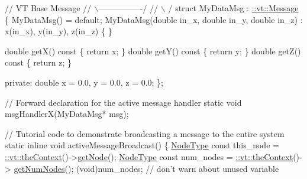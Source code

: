 \begin{DoxyCodeInclude}
\textcolor{comment}{//                  VT Base Message}
\textcolor{comment}{//                 \(\backslash\)----------------/}
\textcolor{comment}{//                  \(\backslash\)              /}
\textcolor{keyword}{struct }MyDataMsg : \hyperlink{structvt_1_1messaging_1_1_active_msg}{::vt::Message} \{
  MyDataMsg() = \textcolor{keywordflow}{default};
  MyDataMsg(\textcolor{keywordtype}{double} in\_x, \textcolor{keywordtype}{double} in\_y, \textcolor{keywordtype}{double} in\_z)
    : x(in\_x), y(in\_y), z(in\_z)
  \{ \}

  \textcolor{keywordtype}{double} getX()\textcolor{keyword}{ const }\{ \textcolor{keywordflow}{return} x; \}
  \textcolor{keywordtype}{double} getY()\textcolor{keyword}{ const }\{ \textcolor{keywordflow}{return} y; \}
  \textcolor{keywordtype}{double} getZ()\textcolor{keyword}{ const }\{ \textcolor{keywordflow}{return} z; \}

\textcolor{keyword}{private}:
  \textcolor{keywordtype}{double} x = 0.0, y = 0.0, z = 0.0;
\};

\textcolor{comment}{// Forward declaration for the active message handler}
\textcolor{keyword}{static} \textcolor{keywordtype}{void} msgHandlerX(MyDataMsg* msg);

\textcolor{comment}{// Tutorial code to demonstrate broadcasting a message to the entire system}
\textcolor{keyword}{static} \textcolor{keyword}{inline} \textcolor{keywordtype}{void} activeMessageBroadcast() \{
  \hyperlink{namespacevt_a866da9d0efc19c0a1ce79e9e492f47e2}{NodeType} \textcolor{keyword}{const} this\_node = \hyperlink{namespacevt_a26551fe0e6e6a1371111df5b12c7e92c}{::vt::theContext}()->\hyperlink{structvt_1_1ctx_1_1_context_a0d52c263ce8516546a67443d9a86fa5f}{getNode}();
  \hyperlink{namespacevt_a866da9d0efc19c0a1ce79e9e492f47e2}{NodeType} \textcolor{keyword}{const} num\_nodes = \hyperlink{namespacevt_a26551fe0e6e6a1371111df5b12c7e92c}{::vt::theContext}()->
      \hyperlink{structvt_1_1ctx_1_1_context_a7f41071aadf6d5fa9e1b6c703c5ff19d}{getNumNodes}();
  (void)num\_nodes;  \textcolor{comment}{// don't warn about unused variable}


\end{DoxyCodeInclude}
